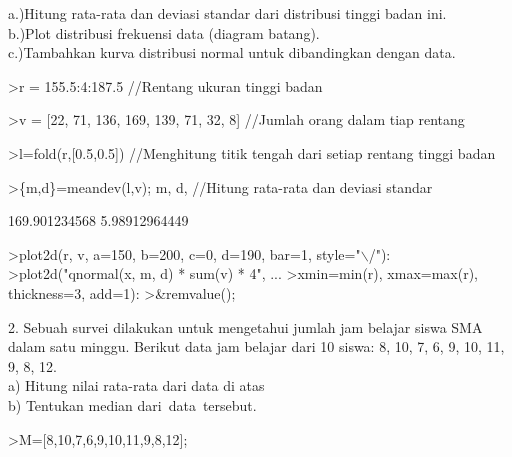 \documentclass[a4paper,10pt]{article}
\begin{document}
\begin{eulernotebook}
\begin{eulercomment}
\begin{eulercomment}
\begin{eulercomment}
\begin{eulercomment}
\begin{eulercomment}
\begin{eulercomment}
\begin{eulercomment}
\begin{eulercomment}
\begin{eulercomment}
a.)Hitung rata-rata dan deviasi standar dari distribusi tinggi badan
ini.\\
b.)Plot distribusi frekuensi data (diagram batang).\\
c.)Tambahkan kurva distribusi normal untuk dibandingkan dengan data.
\end{eulercomment}
\begin{eulerprompt}
>r = 155.5:4:187.5  //Rentang ukuran tinggi badan
\end{eulerprompt}
\begin{euleroutput}
  [155.5,  159.5,  163.5,  167.5,  171.5,  175.5,  179.5,  183.5,  187.5]
\end{euleroutput}
\begin{eulerprompt}
>v = [22, 71, 136, 169, 139, 71, 32, 8] //Jumlah orang dalam tiap rentang
\end{eulerprompt}
\begin{euleroutput}
  [22,  71,  136,  169,  139,  71,  32,  8]
\end{euleroutput}
\begin{eulerprompt}
>l=fold(r,[0.5,0.5])  //Menghitung titik tengah dari setiap rentang tinggi badan
\end{eulerprompt}
\begin{euleroutput}
  [157.5,  161.5,  165.5,  169.5,  173.5,  177.5,  181.5,  185.5]
\end{euleroutput}
\begin{eulerprompt}
>\{m,d\}=meandev(l,v); m, d,  //Hitung rata-rata dan deviasi standar
\end{eulerprompt}
\begin{euleroutput}
  169.901234568
  5.98912964449
\end{euleroutput}
\begin{eulerprompt}
>plot2d(r, v, a=150, b=200, c=0, d=190, bar=1, style="\(\backslash\)/"):
>plot2d("qnormal(x, m, d) * sum(v) * 4", ...
>xmin=min(r), xmax=max(r), thickness=3, add=1):
>&remvalue();
\end{eulerprompt}
\begin{eulercomment}
2. Sebuah survei dilakukan untuk mengetahui jumlah jam belajar siswa
SMA dalam satu minggu. Berikut data jam belajar dari 10 siswa: 8, 10,
7, 6, 9, 10, 11, 9, 8, 12.\\
a) Hitung nilai rata-rata dari data di atas\\
b) Tentukan median dari data tersebut.
\end{eulercomment}
\begin{eulerprompt}
>M=[8,10,7,6,9,10,11,9,8,12];

\end{eulerprompt}
\end{eulercomment}
\end{eulercomment}
\end{eulercomment}
\end{eulercomment}
\end{eulercomment}
\end{eulercomment}
\end{eulercomment}
\end{eulercomment}
\end{eulernotebook}
\end{document}
